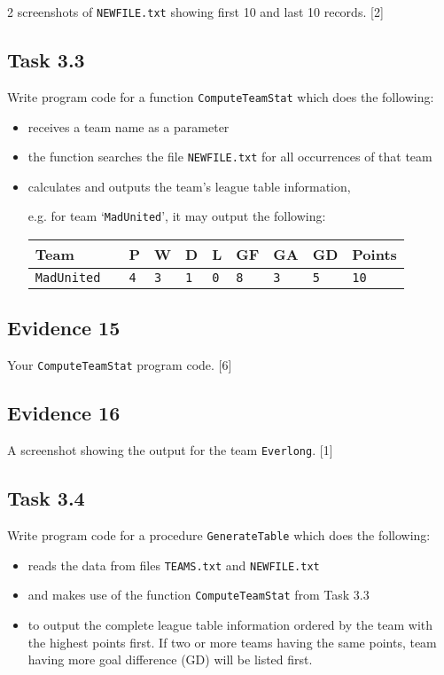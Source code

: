 2 screenshots of \texttt{NEWFILE.txt} showing first 10 and last 10
records. \hfill{} {[}2{]}

\subsection*{Task 3.3 }

Write program code for a function \texttt{ComputeTeamStat} which does
the following: 
\begin{itemize}
\item receives a team name as a parameter 
\item the function searches the file \texttt{NEWFILE.txt} for all occurrences
of that team
\item calculates and outputs the team\textquoteright s league table information, 

e.g. for team \textquoteleft \texttt{MadUnited}\textquoteright , it
may output the following: 
\noindent \begin{center}
\begin{tabular}{llllllllll}
\textbf{Team} &  & \textbf{P} & \textbf{W} & \textbf{D} & \textbf{L} & \textbf{GF} & \textbf{GA} & \textbf{GD} & \textbf{Points}\tabularnewline
\hline 
\texttt{MadUnited} &  & \texttt{4} & \texttt{3} & \texttt{1} & \texttt{0} & \texttt{8} & \texttt{3} & \texttt{5} & \texttt{10}\tabularnewline
\end{tabular}
\par\end{center}
\end{itemize}

\subsection*{Evidence 15 }

Your \texttt{ComputeTeamStat} program code.\hfill{} {[}6{]}

\subsection*{Evidence 16 }

A screenshot showing the output for the team \texttt{Everlong}. \hfill{}{[}1{]}

\subsection*{Task 3.4 }

Write program code for a procedure \texttt{GenerateTable} which does
the following: 
\begin{itemize}
\item reads the data from files \texttt{TEAMS.txt} and \texttt{NEWFILE.txt}
\item and makes use of the function \texttt{ComputeTeamStat} from Task 3.3 
\item to output the complete league table information ordered by the team
with the highest points first. If two or more teams having the same
points, team having more goal difference (GD) will be listed first. 
\end{itemize}

